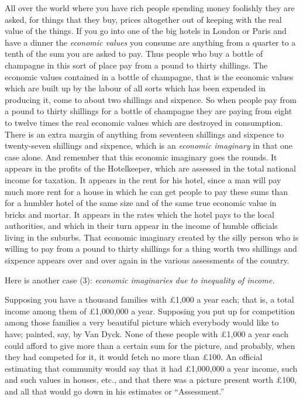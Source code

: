 \documentclass{book}
\begin{document}
All over the world where you have rich people spending money foolishly they are asked, for things that they buy, prices altogether out of keeping with the real value of the things. If you go into one of the big hotels in London or Paris and have a dinner the \emph{economic values} you consume are anything from a quarter to a tenth of the sum you are asked to pay. Thus people who buy a bottle of champagne in this sort of place pay from a pound to thirty shillings. The economic values contained in a bottle of champagne, that is the economic values which are built up by the labour of all sorts which has been expended in producing it, come to about two shillings and sixpence. So when people pay from a pound to thirty shillings for a bottle of champagne they are paying from eight to twelve times the real economic values which are destroyed in consumption. There is an extra margin of anything from seventeen shillings and sixpence to twenty-seven shillings and sixpence, which is an \emph{economic imaginary} in that one case alone. And remember that this economic imaginary goes the rounds. It appears in the profits of the Hotelkeeper, which are assessed in the total national income for taxation. It appears in the rent for his hotel, since a man will pay much more rent for a house in which he can get people to pay these sums than for a humbler hotel of the same size and of the same true economic value in bricks and mortar. It appears in the rates which the hotel pays to the local authorities, and which in their turn appear in the income of humble officials living in the suburbs. That economic imaginary created by the silly person who is willing to pay from a pound to thirty shillings for a thing worth two shillings and sixpence appears over and over again in the various assessments of the country.

Here is another case (3): \emph{economic imaginaries due to inequality of income.}

Supposing you have a thousand families with £1,000 a year each; that is, a total income among them of £1,000,000 a year. Supposing you put up for competition among those families a very beautiful picture which everybody would like to have; painted, say, by Van Dyck. None of these people with £1,000 a year each could afford to give more than a certain sum for the picture, and probably, when they had competed for it, it would fetch no more than £100. An official estimating that community would say that it had £1,000,000 a year income, such and such values in houses, etc., and that there was a picture present worth £100, and all that would go down in his estimates or “Assessment.”
\end{document}
